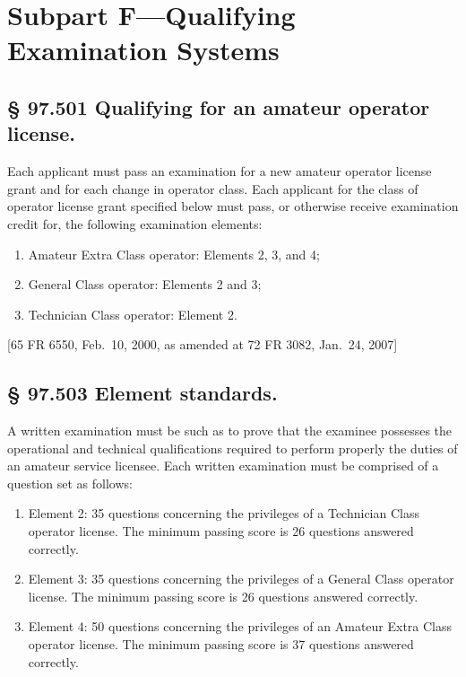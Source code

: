 \documentclass[
  letterpaper,
  DIV=11,
  numbers=noendperiod]{scrreport}
\begin{document}
\hypertarget{subpart-fqualifying-examination-systems}{%
\section*{Subpart F---Qualifying Examination
Systems}\label{subpart-fqualifying-examination-systems}}


\hypertarget{qualifying-for-an-amateur-operator-license.}{%
\subsection*{§ 97.501 Qualifying for an amateur operator
license.}\label{qualifying-for-an-amateur-operator-license.}}

Each applicant must pass an examination for a new amateur operator
license grant and for each change in operator class. Each applicant for
the class of operator license grant specified below must pass, or
otherwise receive examination credit for, the following examination
elements:

\begin{enumerate}
\def\labelenumi{(\alph{enumi})}
\item
  Amateur Extra Class operator: Elements 2, 3, and 4;
\item
  General Class operator: Elements 2 and 3;
\item
  Technician Class operator: Element 2.
\end{enumerate}

{[}65 FR 6550, Feb.~10, 2000, as amended at 72 FR 3082, Jan.~24, 2007{]}

\hypertarget{element-standards.}{%
\subsection*{§ 97.503 Element standards.}\label{element-standards.}}

A written examination must be such as to prove that the examinee
possesses the operational and technical qualifications required to
perform properly the duties of an amateur service licensee. Each written
examination must be comprised of a question set as follows:

\begin{enumerate}
\def\labelenumi{(\alph{enumi})}
\item
  Element 2: 35 questions concerning the privileges of a Technician
  Class operator license. The minimum passing score is 26 questions
  answered correctly.
\item
  Element 3: 35 questions concerning the privileges of a General Class
  operator license. The minimum passing score is 26 questions answered
  correctly.
\item
  Element 4: 50 questions concerning the privileges of an Amateur Extra
  Class operator license. The minimum passing score is 37 questions
  answered correctly.
\end{enumerate}
\end{document}
